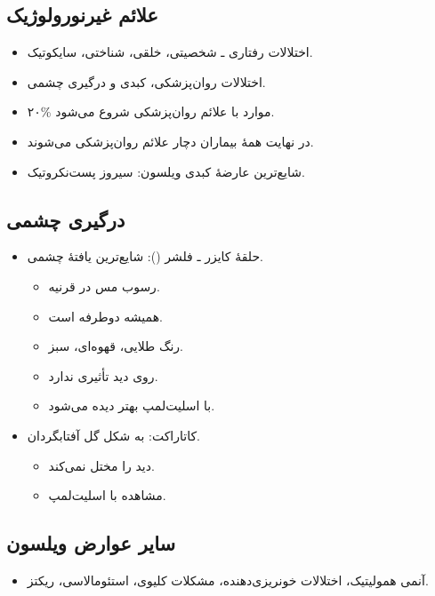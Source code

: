 \documentclass[a4paper,12pt]{extbook}
\begin{document}
\subsection*{علائم غیرنورولوژیک}
\begin{itemize}
\item اختلالات رفتاری ـ شخصیتی، خلقی، شناختی، سایکوتیک.
\item اختلالات روان‌پزشکی، کبدی و درگیری چشمی.
\item ۲۰\% موارد با علائم روان‌پزشکی شروع می‌شود.
\item در نهایت همهٔ بیماران دچار علائم روان‌پزشکی می‌شوند.
\item شایع‌ترین عارضهٔ کبدی ویلسون: سیروز پست‌نکروتیک.
\end{itemize}
\subsection*{درگیری چشمی}
\begin{itemize}
\item حلقهٔ کایزر ـ فلشر (): شایع‌ترین یافتهٔ چشمی.
\begin{itemize}
\item رسوب مس در قرنیه.
\item همیشه دوطرفه است.
\item رنگ طلایی، قهوه‌ای، سبز.
\item روی دید تأثیری ندارد.
\item با اسلیت‌لمپ بهتر دیده می‌شود.
\end{itemize}
\end{itemize}

\begin{itemize}
\item کاتاراکت: به شکل گل آفتابگردان.
\begin{itemize}
\item دید را مختل نمی‌کند.
\item مشاهده با اسلیت‌لمپ.
\end{itemize}
\end{itemize}
\subsection*{سایر عوارض ویلسون}
\begin{itemize}
\item آنمی همولیتیک، اختلالات خونریزی‌دهنده، مشکلات کلیوی، استئومالاسی، ریکتز.
\end{itemize}
\end{document}
